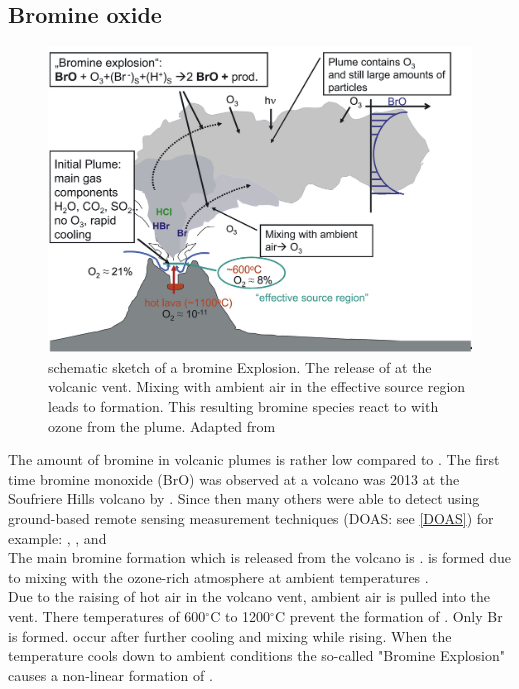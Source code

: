 \documentclass  [
  paper    = a4,
  BCOR     = 10mm,
  twoside,
  fontsize = 12pt,
  fleqn,
  toc      = bibnumbered,
  toc      = listofnumbered,
  numbers  = noendperiod,
  headings = normal,
  listof   = leveldown,
  version  = 3.03
]                                       {scrreprt}
\begin{document}
\subsection{Bromine oxide}
%
\begin{figure}
	\centering
	\includegraphics[width=0.8\linewidth]{Bilder/Simon/Bilder_Tung/BrO_Plume}
	\caption[schematic sketch of a bromine Explosion. Adapted from \citet{bobrowski2007reactive}.]{schematic sketch of a bromine Explosion.
		The release of  at the volcanic vent. Mixing with ambient air in the effective source region leads to  formation. This resulting bromine species react to  with ozone from the plume. Adapted from \citet{bobrowski2007reactive}}
	\label{fig:broplume}
\end{figure}
The amount of bromine in volcanic plumes is rather low compared to . The first time bromine monoxide (BrO) was observed at a volcano was 2013 at the Soufriere Hills volcano by \citet{bobrowski2003detection}. Since then many others were able to detect   using ground-based remote sensing measurement techniques (DOAS: see \cref{DOAS}) for example:
\citet{bobrowski2007so2}, \citet{bobrowski2007reactive},\citet{vogel2011volcanic} and \citet{lubcke2014bro}
\\
The main bromine formation which is released from the volcano is  .   is formed due to mixing with the ozone-rich atmosphere at ambient temperatures \citep{bobrowski2007reactive}.\\
Due to the raising of hot air in the volcano vent, ambient air is pulled into the vent. There temperatures of  600$^{\circ}$C to 1200$^{\circ}$C    prevent the formation of . Only Br is formed.   occur after further cooling and mixing while rising. When the temperature cools down to ambient conditions the so-called "Bromine Explosion" causes a non-linear formation of .
\end{document}
